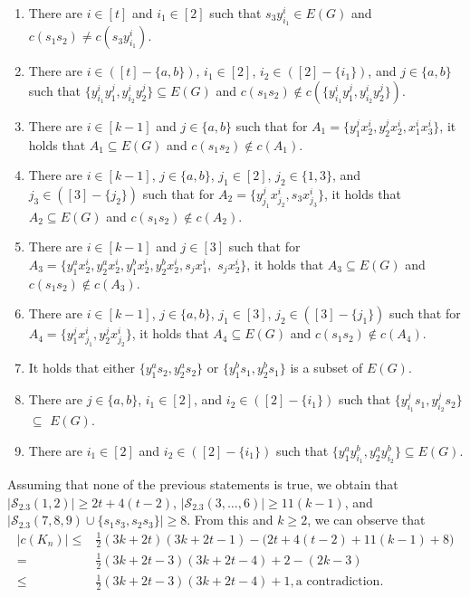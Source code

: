 \documentclass[12pt]{article}
\begin{document}
\begin{enumerate}
  \item There are $i\in[t]$ and $i_1\in[2]$ such that $s_3 y^i_{i_1} \in E(G)$ and $c(s_1s_2)\neq c(s_3 y^i_{i_1})$.
  \item There are $i\in([t]-\{a,b\})$, $i_1\in[2]$, $i_2\in([2]-\{i_1\})$, and $j\in\{a,b\}$ such that $\{y^i_{i_1}y^j_{1},y^i_{i_2}y^j_{2}\}\subseteq E(G)$ and $c(s_1s_2)\not\in c(\{y^i_{i_1}y^j_{1},y^i_{i_2}y^j_{2}\})$. 
  \item There are $i \in [k-1]$ and $j\in\{a,b\}$ such that for $A_1=\{y^j_{1}x^i_{2},y^j_{2}x^i_{2}, x^i_1x^i_3\}$, it holds that $A_1\subseteq E(G)$ and $c(s_1s_2) \notin c(A_1)$.
  \item There are $i \in [k-1]$, $j \in \{a,b\}$, $j_1\in[2]$,  $j_2\in\{1,3\}$, and $j_3\in([3]-\{j_2\})$ such that for $A_2=\{y^j_{j_1}x^i_{j_2}, s_3x^i_{j_3}\}$, it holds that $A_2\subseteq E(G)$ and $c(s_1s_2) \notin c(A_2)$.
  \item There are $i \in [k-1]$ and $j \in [3]$ such that for $A_3=\{y^a_1x^i_{2}, y^a_2x^i_{2},y^b_1x^i_{2}, y^b_2x^i_{2},s_jx^i_1,$ $s_jx^i_2\}$, it holds that $A_3\subseteq E(G)$ and $c(s_1s_2) \notin c(A_3)$.
  \item There are $i \in [k-1]$, $j\in\{a,b\}$, $j_1 \in [3]$, $j_2\in([3]-\{j_1\})$ such that for $A_4=\{y^j_1x^i_{j_1}, y^j_2x^i_{j_2}\}$, it holds that $A_4\subseteq E(G)$ and $c(s_1s_2) \notin c(A_4)$.
  \item It holds that either $\{y^a_1s_2,y^a_2s_2\}$ or $\{y^b_1s_1,y^b_2s_1\}$ is a subset of $E(G)$.
  \item There are $j\in\{a,b\}$, $i_1\in[2]$, and $i_2\in([2]-\{i_1\})$ such that $\{y^j_{i_1}s_1,y^j_{i_2}s_2\}$ $\subseteq$ $E(G)$.
  \item There are $i_1\in[2]$ and $i_2\in([2]-\{i_1\})$ such that $\{y^a_1y^b_{i_1},y^a_2y^b_{i_2}\}\subseteq E(G)$.
  \end{enumerate}
  Assuming that none of the previous statements is true, we obtain that $|\mathcal{S}_{2.3}(1,2)| \geq 2t + 4(t - 2)$, $|\mathcal{S}_{2.3}(3,\ldots,6)| \geq 11(k-1)$, and $|\mathcal{S}_{2.3}(7,8,9) \cup \{s_1s_3,s_2s_3\}| \geq 8$. From this and $k\geq2$, we can observe that
  \begin{align*}
  |c(K_n)|\leq & \frac{1}{2}(3k+2t)(3k+2t-1)-\big(2t+4(t-2)+11(k-1)+8\big)\\
  =& \frac{1}{2}(3k+2t-3)(3k+2t-4)+2-(2k-3)\\
  \leq &\frac{1}{2}(3k+2t-3)(3k+2t-4)+1,\text{a contradiction}.
\end{align*}
\end{document}
